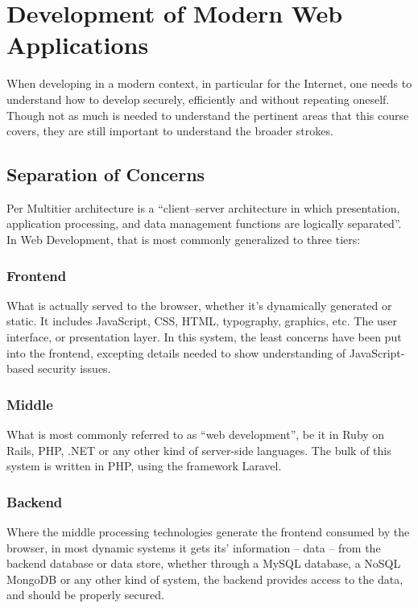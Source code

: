 \chapter{Development of Modern Web Applications}
\label{ch:theory}
\noindent
When developing in a modern context, in particular for the Internet, one needs to
understand how to develop securely, efficiently and without repeating oneself. Though not as much is needed to understand the pertinent areas that this course covers, they are still important to understand the broader strokes.

\section{Separation of Concerns}
\label{sec:architecture}
\noindent
Per \citep{Wikipedia2013} Multitier architecture is a ``client–server architecture in which presentation, application processing, and data management functions are logically separated''. In Web Development, that is most commonly generalized to three tiers:

\subsection{Frontend}
\noindent
What is actually served to the browser, whether it's dynamically generated or static. It includes JavaScript, CSS, HTML, typography, graphics, etc. The user interface, or presentation layer. In this system, the least concerns have been put into the frontend, excepting details needed to show understanding of JavaScript-based security issues.

\subsection{Middle}
\noindent
What is most commonly referred to as ``web development'', be it in Ruby on Rails, PHP,
.NET or any other kind of server-side languages. The bulk of this system is written in PHP,
using the framework Laravel.

\subsection{Backend}
\noindent
Where the middle processing technologies generate the frontend consumed by the browser, in most dynamic systems it gets its' information -- data -- from the backend database or data store, whether through a MySQL database, a NoSQL MongoDB or any other kind of system, the backend provides access to the data, and should be properly secured.

